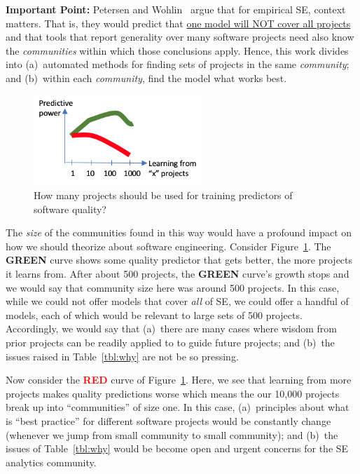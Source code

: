 {\bf Important Point:}  
Petersen and Wohlin~\cite{Petersen2009} argue that for empirical SE, context matters.
That is, they would 
predict that \underline{one model  will NOT  cover
all  projects} and that  
tools that report  generality  over many software projects need also know the {\em communities} within which those conclusions   apply. 
Hence, this work divides into 
 (a)~automated methods for finding sets of  
projects in the same {\em community};
and (b)~within each {\em community}, 
find the model what works best.   


\begin{figure}
\includegraphics[width=2.5in]{figs/results.png}
\caption{How many projects should be used for training predictors of software quality?}\label{results}
\end{figure}
The {\em size} of the communities found in this way
would have a profound impact on how we should theorize about software engineering. Consider Figure~\ref{results}. 
The \textcolor{ao(english)}{{\bf GREEN}} curve shows
some quality predictor that gets better, the more projects it learns from. After about 500 projects, the \textcolor{ao(english)}{{\bf GREEN}} curve's growth stops and we would say that community size here was around 500 projects. In this case, while we could not offer models that cover {\em all} of SE, we could offer a handful of models, each of which would be relevant to large sets of 500   projects.
Accordingly, we would say that (a)~there are   many cases where  wisdom from
prior projects can be readily applied to  
to guide future projects; and (b)~the issues raised in Table~\ref{tbl:why} are not be so pressing.


Now consider the \textcolor{red}{{\bf RED}} curve of 
Figure~\ref{results}. Here, we see that learning from more projects makes quality predictions worse which means the our 10,000 projects break up into ``communities'' of size one.
In this case,  (a)~principles about what is ``best practice'' for different software projects
would be constantly change (whenever we jump from small community to small community);
and (b)~the issues of Table~\ref{tbl:why} would be become open and urgent concerns for the SE analytics community.
 



